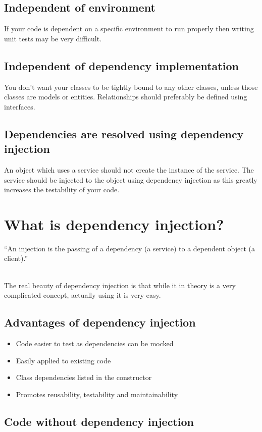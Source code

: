 \documentclass[12pt]{article}
\begin{document}
\subsection{Independent of environment}
If your code is dependent on a specific environment to run properly then writing unit tests may be very difficult.

\subsection{Independent of dependency implementation}
You don't want your classes to be tightly bound to any other classes, unless those classes are models or entities. Relationships should preferably be defined using interfaces.

\subsection{Dependencies are resolved using dependency injection}
An object which uses a service should not create the instance of the service. The service should be injected to the object using dependency injection as this greatly increases the testability of your code.

\section{What is dependency injection?}
{\large ``An injection is the passing of a dependency (a service) to a dependent object (a client).''}
\vskip5mm
\hspace*{}

~\\
The real beauty of dependency injection is that while it in theory is a very complicated concept, actually using it is very easy.

\subsection{Advantages of dependency injection}
\begin{itemize}
	\item Code easier to test as dependencies can be mocked
	\item Easily applied to existing code
	\item Class dependencies listed in the constructor
	\item Promotes reusability, testability and maintainability
\end{itemize}

\subsection{Code without dependency injection}

\end{document}
